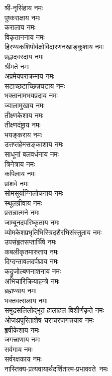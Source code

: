 \begin{multicols}{2}
\begin{flushleft}
श्री-नृसिंहाय नमः\\
पुष्कराक्षाय नमः\\
करालाय नमः\\
विकृताननाय नमः\\
हिरण्यकशिपोर्वक्षोविदारणनखाङ्कुशाय नमः\\
प्रह्लादवरदाय नमः\\
श्रीमते नमः\\
अप्रमेयपराक्रमाय नमः\\
सटाच्छटाच्छिन्नघटाय नमः\\
भक्तानामभयप्रदाय नमः\hfill{}\\
ज्वालामुखाय नमः\\
तीक्ष्णकेशाय नमः\\
तीक्ष्णदंष्ट्राय नमः\\
भयङ्कराय नमः\\
उत्तप्तहेमसङ्काशाय नमः\\
साधूनां बलवर्धनाय नमः\\
त्रिनेत्राय नमः\\
कपिलाय नमः\\
प्रांशवे नमः\\
सोमसूर्याग्निलोचनाय नमः\hfill{}\\
स्थूलग्रीवाय नमः\\
प्रसन्नात्मने नमः\\
जाम्बूनदपरिष्कृताय नमः\\
व्योमकेशप्रभृतिभिस्त्रिदशैरभिसंस्तुताय नमः\\
उपसंहृतसप्तार्चिषे नमः\\
कबलीकृतमारुताय नमः\\
दिग्दन्तावलदर्पघ्राय नमः\\
कद्रुजोल्बणनाशनाय नमः\\
अभिचारिक्रियाहन्त्रे नमः\\
ब्रह्मण्याय नमः\hfill{}\\
भक्तवत्सलाय नमः\\
समुद्रसलिलोद्भूत-हालाहल-विशीर्णकृते नमः\\
ओजःप्रपूरिताशेष-चराचरजगत्त्रयाय नमः\\
हृषीकेशाय नमः\\
जगत्त्राणाय नमः\\
सर्वगाय नमः\\
सर्वरक्षकाय नमः\\
नास्तिक्य-प्रत्यवायार्थदर्शितात्म-प्रभाववते~नमः\\

\end{flushleft}
\end{multicols}
